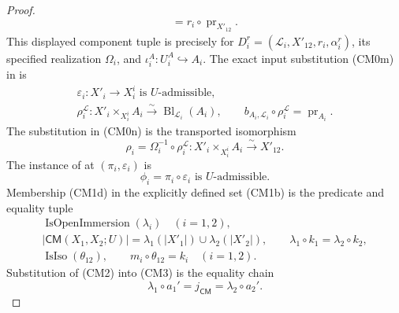 \begin{proof}
\[\begin{gathered}
      =r_i\circ\operatorname{pr}_{X'_{12}}.
  \end{gathered}
  \]
  This displayed component tuple is precisely
   for
  \(D_i^r=(\mathcal L_i,X'_{12},r_i,\alpha_i^r)\), its specified realization
  \(\Omega_i\), and
  \(\iota_i^A\colon U_i^A\hookrightarrow A_i\).
  The exact input substitution (CM0m) in
   is
  \[
  \begin{gathered}
    \varepsilon_i\colon X'_i\to X_i^i
      \text{ is }U\text{-admissible},\\
    \rho_i^{\mathcal L}\colon X'_i\times_{X_i^i}A_i
      \xrightarrow{\sim}\operatorname{Bl}_{\mathcal L_i}(A_i),
    \qquad
    b_{A_i,\mathcal L_i}\circ\rho_i^{\mathcal L}
      =\operatorname{pr}_{A_i}.
  \end{gathered}
  \]
  The substitution in (CM0n) is the transported isomorphism
  \[
    \rho_i=\Omega_i^{-1}\circ\rho_i^{\mathcal L}
      \colon X'_i\times_{X_i^i}A_i\xrightarrow{\sim}X'_{12}.
  \]
  The instance of  at
  $(\pi_i,\varepsilon_i)$ is
  \[
    \phi_i=\pi_i\circ\varepsilon_i
      \text{ is }U\text{-admissible}.
  \]
  Membership (CM1d) in the explicitly defined set (CM1b) is the predicate and
  equality tuple
  \[
  \begin{gathered}
    \operatorname{IsOpenImmersion}(\lambda_i)\quad(i=1,2),\\
    |\mathsf{CM}(X_1,X_2;U)|
      =\lambda_1(|X'_1|)\cup\lambda_2(|X'_2|),\qquad
    \lambda_1\circ k_1=\lambda_2\circ k_2,\\
    \operatorname{IsIso}(\theta_{12}),\qquad
    m_i\circ\theta_{12}=k_i\quad(i=1,2).
  \end{gathered}
  \]
  Substitution of (CM2) into (CM3) is the equality chain
  \[
    \lambda_1\circ a_1'=j_{\mathsf{CM}}
      =\lambda_2\circ a_2'.                                      \tag{CM4}
  \]


\end{proof}
